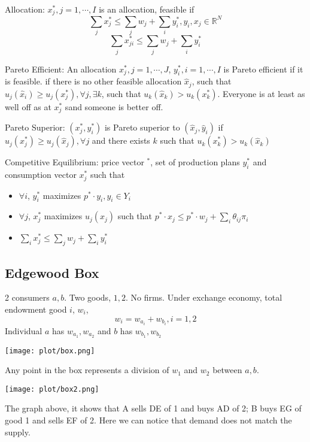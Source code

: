 \documentclass[11pt, a4paper, oneside]{article}
\theoremstyle{definition}
\theoremstyle{proposition}
\theoremstyle{corollary}
\theoremstyle{lemma}
\theoremstyle{theorem}
\begin{document}
Allocation: $x^*_j, j = 1,\cdots, I$ is an allocation, feasible if $$\sum_j x_j^* \leq \sum_j w_j + \sum_i y^*_i , y_i,x_j \in \mathbb{R}^N$$
$$\sum_jx_{ji}^* \leq \sum_j w_j + \sum_i y_i^*$$

Pareto Efficient: An allocation $x_j^*, j = 1, \cdots, J$, $y_i^*, i =1, \cdots, I$ is Pareto efficient if it is feasible. if there is no other feasible allocation $\hat{x}_j$, such that $u_j(\hat{x}_i)\geq u_j(x_j^*), \forall j, \exists k$, such that $u_k(\hat{x}_k) > u_k(x_k^*)$. Everyone is at least as well off as at $x_j^*$ sand someone is better off. 

Pareto Superior: $(x_j^*, y_i^*)$ is Pareto superior to $(\hat{x}_j, \hat{y}_i)$ if $u_j(x_j^*)\geq u_j(\hat{x}_j), \forall j$ and there exists $k$ such that $u_k(x_k^*)> u_k(\hat{x}_k)$

Competitive Equilibrium: price vector $^*$, set of production plans $y_i^*$ and consumption vector $x_j^*$ such that
\begin{itemize}
\item $\forall i$, $y_i^*$ maximizes $p^*\cdot y_i, y_i \in Y_i$ 
\item $\forall j$, $x_j^*$ maximizes $u_j(x_j)$ such that $p^*\cdot x_j \leq p^* \cdot w_j +\sum_i \theta_{ij}\pi_i$
\item $\sum_i x^*_j \leq \sum_j w_j + \sum_i y_i^*$
\end{itemize}

\subsection{Edgewood Box}
2 consumers $a, b$. Two goods, $1, 2$. No firms. Under exchange economy, total endowment good $i$, $w_i$, 
$$w_i = w_{a_i}+w_{b_i}, i=1, 2$$
Individual $a$ has $w_{a_1}, w_{a_2}$ and $b$ has $w_{b_1}, w_{b_2}$ 

\begin{center}
\texttt{[image: plot/box.png]}
\end{center}

Any point in the box represents a division of $w_1$ and $w_2$ between $a, b$. 

\begin{center}
\texttt{[image: plot/box2.png]}
\end{center}

The graph above, it shows that A sells DE of 1 and buys AD of 2; B buys EG of good 1 and sells EF of 2. Here we can notice that demand does not match the supply. 
\end{document}
